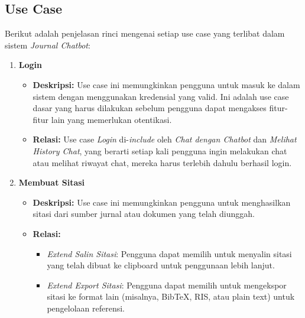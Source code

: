 \subsection{Use Case}
Berikut adalah penjelasan rinci mengenai setiap use case yang terlibat dalam sistem \textit{Journal Chatbot}:

\begin{enumerate}
    \item \textbf{Login}
    \begin{itemize}
        \item \textbf{Deskripsi:} Use case ini memungkinkan pengguna untuk masuk ke dalam sistem dengan menggunakan kredensial yang valid. Ini adalah use case dasar yang harus dilakukan sebelum pengguna dapat mengakses fitur-fitur lain yang memerlukan otentikasi.
        \item \textbf{Relasi:} Use case \textit{Login} di-\textit{include} oleh \textit{Chat dengan Chatbot} dan \textit{Melihat History Chat}, yang berarti setiap kali pengguna ingin melakukan chat atau melihat riwayat chat, mereka harus terlebih dahulu berhasil login.
    \end{itemize}

    \item \textbf{Membuat Sitasi}
    \begin{itemize}
        \item \textbf{Deskripsi:} Use case ini memungkinkan pengguna untuk menghasilkan sitasi dari sumber jurnal atau dokumen yang telah diunggah.
        \item \textbf{Relasi:}
        \begin{itemize}
            \item \textit{Extend Salin Sitasi}: Pengguna dapat memilih untuk menyalin sitasi yang telah dibuat ke clipboard untuk penggunaan lebih lanjut.
            \item \textit{Extend Export Sitasi}: Pengguna dapat memilih untuk mengekspor sitasi ke format lain (misalnya, Bib\TeX, RIS, atau plain text) untuk pengelolaan referensi.
        \end{itemize}
    \end{itemize}


\end{enumerate}
